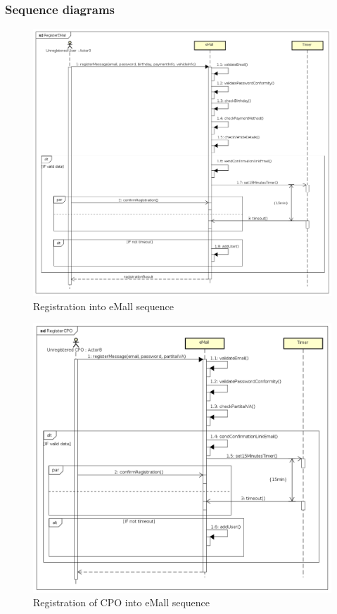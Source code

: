 \subsubsection{Sequence diagrams}
\begin{figure}[!h]
    \begin{center}
        \includegraphics[keepaspectratio, width=16cm]{Sequence/RegisterEMall.png}
        \caption{Registration into \ac{eMall} sequence}
    \end{center}
\end{figure}
\begin{figure}[!h]
    \begin{center}
        \includegraphics[keepaspectratio, width=16cm]{Sequence/RegisterCPO.png}
        \caption{Registration of \ac{CPO} into \ac{eMall} sequence}
    \end{center}
\end{figure}
